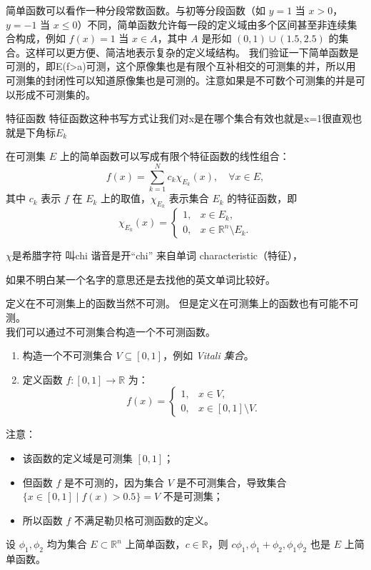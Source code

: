 \documentclass[lang=cn,10pt]{elegantbook}
\begin{document}
简单函数可以看作一种分段常数函数。与初等分段函数（如 $y=1$ 当 $x>0$，$y=-1$ 当 $x \leq 0$）不同，简单函数允许每一段的定义域由多个区间甚至非连续集合构成，例如 $f(x) = 1$ 当 $x \in A$，其中 $A$ 是形如 $(0,1) \cup (1.5, 2.5)$ 的集合。这样可以更方便、简洁地表示复杂的定义域结构。
我们验证一下简单函数是可测的，即E(f>a)可测，这个原像集也是有限个互补相交的可测集的并，所以用可测集的封闭性可以知道原像集也是可测的。注意如果是不可数个可测集的并是可以形成不可测集的。
\begin{definition}{特征函数}
    特征函数这种书写方式让我们对x是在哪个集合有效也就是x=1很直观也就是下角标$E_k$

在可测集 $E$ 上的简单函数可以写成有限个特征函数的线性组合：
\[
f(x) = \sum_{k=1}^{N} c_k \chi_{E_k}(x), \quad \forall x \in E,
\]
其中 $c_k$ 表示 $f$ 在 $E_k$ 上的取值，$\chi_{E_k}$ 表示集合 $E_k$ 的特征函数，即
\[
\chi_{E_k}(x) =
\begin{cases}
1, & x \in E_k, \\
0, & x \in \mathbb{R}^n \setminus E_k.
\end{cases}
\]
\end{definition}
$\chi$是希腊字符 叫chi 谐音是开“chi” 来自单词 characteristic（特征），
\begin{dxtips}
    
如果不明白某一个名字的意思还是去找他的英文单词比较好。
\end{dxtips}
定义在不可测集上的函数当然不可测。
但是定义在可测集上的函数也有可能不可测。\\
我们可以通过不可测集合构造一个不可测函数。
\begin{enumerate}
  \item 构造一个不可测集合 $V \subseteq [0,1]$，例如 \emph{Vitali 集合}。
  
  \item 定义函数 $f: [0,1] \to \mathbb{R}$ 为：
  \[
  f(x) = 
  \begin{cases}
  1, & x \in V, \\
  0, & x \in [0,1] \setminus V.
  \end{cases}
  \]
\end{enumerate}

注意：
\begin{itemize}
  \item 该函数的定义域是可测集 $[0,1]$；
  \item 但函数 $f$ 是不可测的，因为集合 $V$ 是不可测集合，导致集合 $\{x \in [0,1] \mid f(x) > 0.5\} = V$ 不是可测集；
  \item 所以函数 $f$ 不满足勒贝格可测函数的定义。
\end{itemize}
\begin{lemma}[简单函数封闭性]
设 $\phi_1, \phi_2$ 均为集合 $E \subset \mathbb{R}^n$ 上简单函数，$c \in \mathbb{R}$，则 $c\phi_1, \phi_1 + \phi_2, \phi_1\phi_2$ 也是 $E$ 上简单函数。
\end{lemma}
\end{document}
